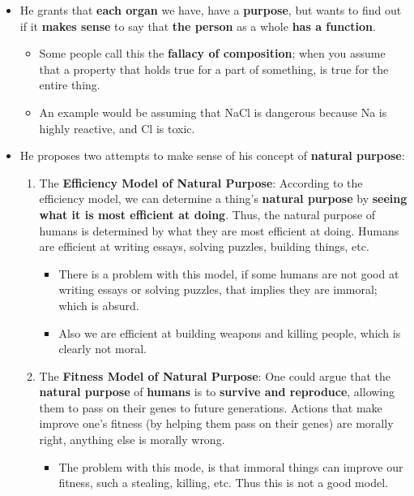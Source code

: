 \documentclass{article}
\begin{document}
\begin{itemize}
        \item He grants that \textbf{each organ} we have, have a \textbf{purpose}, but wants to find out if it \textbf{makes sense} to say that \textbf{the person} as a whole \textbf{has a function}.
        \begin{itemize}
            \item Some people call this the \textbf{fallacy of composition}; when you assume that a property that holds true for a part of something, is true for the entire thing.
            \item An example would be assuming that NaCl is dangerous because Na is highly reactive, and Cl is toxic.
        \end{itemize}
        \item He proposes two attempts to make sense of his concept of \textbf{natural purpose}:
        \begin{enumerate}
            \item The \textbf{Efficiency Model of Natural Purpose}: According to the efficiency model, we can determine a thing's \textbf{natural purpose} by \textbf{seeing what it is most efficient at doing}. Thus, the natural purpose of humans is determined by what they are most efficient at doing. Humans are efficient at writing essays, solving puzzles, building things, etc.
            \begin{itemize}
                \item There is a problem with this model, if some humans are not good at writing essays or solving puzzles, that implies they are immoral; which is absurd.
                \item Also we are efficient at building weapons and killing people, which is clearly not moral.
            \end{itemize} 
            \item The \textbf{Fitness Model of Natural Purpose}: One could argue that the \textbf{natural purpose} of \textbf{humans} is to \textbf{survive and reproduce}, allowing them to pass on their genes to future generations. Actions that make improve one's fitness (by helping them pass on their genes) are morally right, anything else is morally wrong.
            \begin{itemize}
                \item The problem with this mode, is that immoral things can improve our fitness, such a stealing, killing, etc. Thus this is not a good model.
            \end{itemize}
        \end{enumerate}
    \end{itemize}
\end{document}
